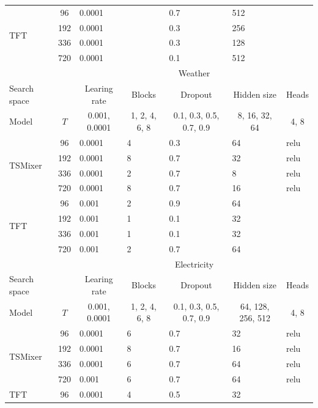 \begin{longtable}{l|c|lllll}
\multirow{4}{*}{TFT} & 96 & 0.0001 &  & 0.7 & 512 &  \\
 & 192 & 0.0001 &  & 0.3 & 256 &  \\
 & 336 & 0.0001 &  & 0.3 & 128 &  \\
 & 720 & 0.0001 &  & 0.1 & 512 &  \\ \hline
 & \multicolumn{1}{l|}{} & \multicolumn{5}{c}{Weather} \\ \hline
Search space & \multicolumn{1}{l|}{} & \multicolumn{1}{c}{Learing rate} & \multicolumn{1}{c}{Blocks} & \multicolumn{1}{c}{Dropout} & \multicolumn{1}{c}{Hidden size} & \multicolumn{1}{c}{Heads} \\ \hline
Model & $T$ & \multicolumn{1}{c}{0.001, 0.0001} & \multicolumn{1}{c}{1, 2, 4, 6, 8} & \multicolumn{1}{c}{0.1, 0.3, 0.5, 0.7, 0.9} & \multicolumn{1}{c}{8, 16, 32, 64} & \multicolumn{1}{c}{4, 8} \\ \hline
\multirow{4}{*}{TSMixer} & 96 & 0.0001 & 4 & 0.3 & 64 & relu \\
 & 192 & 0.0001 & 8 & 0.7 & 32 & relu \\
 & 336 & 0.0001 & 2 & 0.7 & 8 & relu \\
 & 720 & 0.0001 & 8 & 0.7 & 16 & relu \\ \hline
\multirow{4}{*}{TFT} & 96 & 0.001 & 2 & 0.9 & 64 &  \\
 & 192 & 0.001 & 1 & 0.1 & 32 &  \\
 & 336 & 0.001 & 1 & 0.1 & 32 &  \\
 & 720 & 0.001 & 2 & 0.7 & 64 &  \\ \hline
 & \multicolumn{1}{l|}{} & \multicolumn{5}{c}{Electricity} \\ \hline
Search space & \multicolumn{1}{l|}{} & \multicolumn{1}{c}{Learing rate} & \multicolumn{1}{c}{Blocks} & \multicolumn{1}{c}{Dropout} & \multicolumn{1}{c}{Hidden size} & \multicolumn{1}{c}{Heads} \\ \hline
Model & $T$ & \multicolumn{1}{c}{0.001, 0.0001} & \multicolumn{1}{c}{1, 2, 4, 6, 8} & \multicolumn{1}{c}{0.1, 0.3, 0.5, 0.7, 0.9} & \multicolumn{1}{c}{64, 128, 256, 512} & \multicolumn{1}{c}{4, 8} \\ \hline
\multirow{4}{*}{TSMixer} & 96 & 0.0001 & 6 & 0.7 & 32 & relu \\
 & 192 & 0.0001 & 8 & 0.7 & 16 & relu \\
 & 336 & 0.0001 & 6 & 0.7 & 64 & relu \\
 & 720 & 0.001 & 6 & 0.7 & 64 & relu \\ \hline
\multirow{4}{*}{TFT} & 96 & 0.0001 & 4 & 0.5 & 32 &  \\

\end{longtable}
